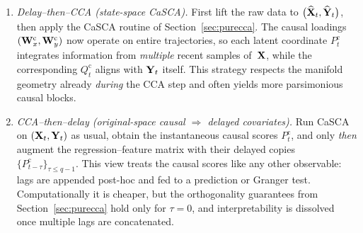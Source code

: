 \documentclass[14pt]{extarticle}
\begin{document}
	\begin{enumerate}[label=\textbf{Schema \roman*.}]
		\item \emph{Delay--then–CCA (state-space CaSCA).}  
		First lift the raw data to $\bigl(\widehat{\mathbf{X}}_t,\widehat{\mathbf{Y}}_t\bigr)$,
		then apply the CaSCA routine of Section~\ref{sec:purecca}.  
		The causal loadings $(\mathbf{W}_x^{\mathrm c},\mathbf{W}_y^{\mathrm c})$ now
		operate on entire trajectories, so each latent coordinate
		$P_t^{\mathrm c}$ integrates information from \emph{multiple} recent
		samples of~$\mathbf{X}$, while the corresponding $Q_t^{\mathrm c}$ aligns
		with $\mathbf{Y}_t$ itself.  
		This strategy respects the manifold geometry already \emph{during}
		the CCA step and often yields more parsimonious causal blocks.
		
		\item \emph{CCA--then–delay (original-space causal $\Rightarrow$ delayed covariates).}  
		Run CaSCA on $(\mathbf{X}_t,\mathbf{Y}_t)$ as usual, obtain the
		instantaneous causal scores $P_t^{\mathrm c}$, and only \emph{then}
		augment the regression–feature matrix with their delayed copies
		$\bigl\{P_{t-\tau}^{\mathrm c}\bigr\}_{\tau\le q-1}$.  
		This view treats the causal scores like any other observable:
		lags are appended post-hoc and fed to a prediction or Granger test.
		Computationally it is cheaper, but the orthogonality guarantees from
		Section~\ref{sec:purecca} hold only for $\tau=0$, and
		interpretability is dissolved once multiple lags are concatenated.
	\end{enumerate}
	
\end{document}
